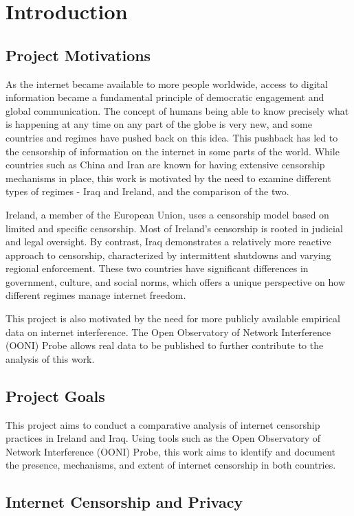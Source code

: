 \chapter{Introduction}

\section{Project Motivations}

As the internet became available to more people worldwide, access to digital information became a fundamental principle of democratic engagement and global communication. The concept of humans being able to know precisely what is happening at any time on any part of the globe is very new, and some countries and regimes have pushed back on this idea. This pushback has led to the censorship of information on the internet in some parts of the world. While countries such as China and Iran are known for having extensive censorship mechanisms in place, this work is motivated by the need to examine different types of regimes - Iraq and Ireland, and the comparison of the two.

Ireland, a member of the European Union, uses a censorship model based on limited and specific censorship. Most of Ireland's censorship is rooted in judicial and legal oversight. By contrast, Iraq demonstrates a relatively more reactive approach to censorship, characterized by intermittent shutdowns and varying regional enforcement. These two countries have significant differences in government, culture, and social norms, which offers a unique perspective on how different regimes manage internet freedom.

This project is also motivated by the need for more publicly available empirical data on internet interference. The Open Observatory of Network Interference (OONI) Probe allows real data to be published to further contribute to the analysis of this work.

\section{Project Goals}

This project aims to conduct a comparative analysis of internet censorship practices in Ireland and Iraq. Using tools such as the Open Observatory of Network Interference (OONI) Probe, this work aims to identify and document the presence, mechanisms, and extent of internet censorship in both countries.

\section{Internet Censorship and Privacy}

